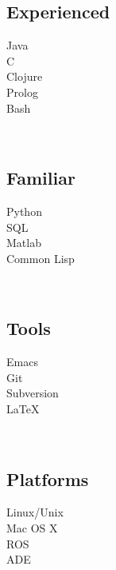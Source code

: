 \documentclass[10pt, letter]{article}
\begin{document}
\begin{minipage}[t]{0.15\textwidth}
  \subsection*{\textbf{Experienced}}
  \begin{center}
    Java \\
    C \\
    Clojure \\
    Prolog \\
    Bash
  \end{center}
\end{minipage}
~\qquad
\begin{minipage}[t]{0.15\textwidth}
  \begin{center}        
    \subsection*{\textbf{Familiar}}
    Python \\
    SQL \\
    Matlab \\
    Common Lisp
  \end{center}
\end{minipage}
~\qquad
\begin{minipage}[t]{0.15\textwidth}
  \begin{center}        
    \subsection*{\textbf{Tools}}
    Emacs \\
    Git \\
    Subversion \\
    \LaTeX
  \end{center}
\end{minipage}
~\qquad
\begin{minipage}[t]{0.15\textwidth}
  \begin{center}        
    \subsection*{\textbf{Platforms}}
    Linux/Unix \\
    Mac OS X \\
    ROS \\
    ADE
  \end{center}
\end{minipage}    

\end{document}
